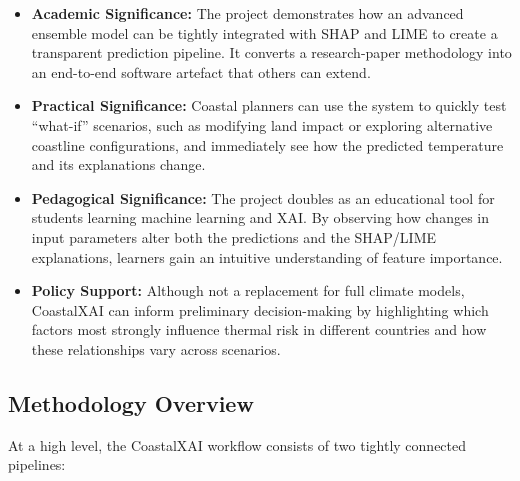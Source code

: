 \documentclass[12pt, a4paper]{article}
\begin{document}
\begin{itemize}
  \item \textbf{Academic Significance:} The project demonstrates how an
  advanced ensemble model can be tightly integrated with SHAP and
  LIME to create a transparent prediction pipeline. It converts a
  research-paper methodology into an end-to-end software artefact
  that others can extend.
  \item \textbf{Practical Significance:} Coastal planners can use the
  system to quickly test ``what-if'' scenarios, such as modifying
  land impact or exploring alternative coastline configurations,
  and immediately see how the predicted temperature and its
  explanations change.
  \item \textbf{Pedagogical Significance:} The project doubles as an
  educational tool for students learning machine learning and XAI.
  By observing how changes in input parameters alter both the
  predictions and the SHAP/LIME explanations, learners gain an
  intuitive understanding of feature importance.
  \item \textbf{Policy Support:} Although not a replacement for full
  climate models, CoastalXAI can inform preliminary decision-making
  by highlighting which factors most strongly influence thermal
  risk in different countries and how these relationships vary
  across scenarios.
\end{itemize}

\subsection{\textbf{Methodology Overview}}

At a high level, the CoastalXAI workflow consists of two tightly
connected pipelines:
\end{document}

